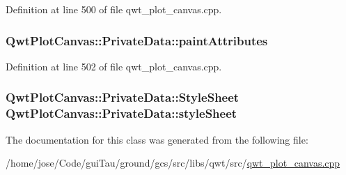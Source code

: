 Definition at line 500 of file qwt\-\_\-plot\-\_\-canvas.\-cpp.

\hypertarget{class_qwt_plot_canvas_1_1_private_data_a21dad4d3dc78b9fb3af836d6256cbb1d}{
\subsubsection[{paint\-Attributes}]{ Qwt\-Plot\-Canvas\-::\-Private\-Data\-::paint\-Attributes}}\label{class_qwt_plot_canvas_1_1_private_data_a21dad4d3dc78b9fb3af836d6256cbb1d}


Definition at line 502 of file qwt\-\_\-plot\-\_\-canvas.\-cpp.

\hypertarget{class_qwt_plot_canvas_1_1_private_data_ada23d2b403df6a5880cafce89ad35a54}{
\subsubsection[{style\-Sheet}]{ {\bf Qwt\-Plot\-Canvas\-::\-Private\-Data\-::\-Style\-Sheet}  Qwt\-Plot\-Canvas\-::\-Private\-Data\-::style\-Sheet}}\label{class_qwt_plot_canvas_1_1_private_data_ada23d2b403df6a5880cafce89ad35a54}


The documentation for this class was generated from the following file\-:\begin{DoxyCompactItemize}
\item 
/home/jose/\-Code/gui\-Tau/ground/gcs/src/libs/qwt/src/\hyperlink{qwt__plot__canvas_8cpp}{qwt\-\_\-plot\-\_\-canvas.\-cpp}\end{DoxyCompactItemize}
